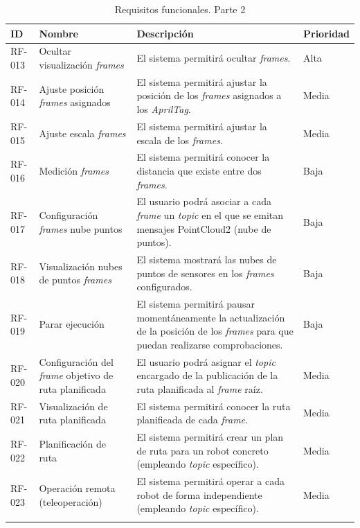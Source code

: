 \begin{longtable}{|p{2cm}|p{4cm}|p{7cm}|p{2cm}|}
\hline
\textbf{ID} & \textbf{Nombre} & \textbf{Descripción} & \textbf{Prioridad} \\
\hline
RF-013 & Ocultar visualización \textit{frames} & El sistema permitirá ocultar \textit{frames}. & Alta \\
\hline
RF-014 & Ajuste posición \textit{frames} asignados & El sistema permitirá ajustar la posición de los \textit{frames} asignados a los \textit{AprilTag}. & Media \\
\hline
RF-015 & Ajuste escala \textit{frames} & El sistema permitirá ajustar la escala de los \textit{frames}. & Media \\
\hline
RF-016 & Medición \textit{frames} & El sistema permitirá conocer la distancia que existe entre dos \textit{frames}. & Baja \\
\hline
RF-017 & Configuración \textit{frames} nube puntos & El usuario podrá asociar a cada \textit{frame} un \textit{topic} en el que se emitan mensajes PointCloud2 (nube de puntos). & Baja \\
\hline
RF-018 & Visualización nubes de puntos \textit{frames} & El sistema mostrará las nubes de puntos de sensores en los \textit{frames} configurados. & Baja \\
\hline
RF-019 & Parar ejecución & El sistema permitirá pausar momentáneamente la actualización de la posición de los \textit{frames} para que puedan realizarse comprobaciones. & Baja \\
\hline
RF-020 & Configuración del \textit{frame} objetivo de ruta planificada & El usuario podrá asignar el \textit{topic} encargado de la publicación de la ruta planificada al \textit{frame} raíz. & Media \\
\hline
RF-021 & Visualización de ruta planificada & El sistema permitirá conocer la ruta planificada de cada \textit{frame}. & Media \\
\hline
RF-022 & Planificación de ruta & El sistema permitirá crear un plan de ruta para un robot concreto (empleando \textit{topic} específico). & Media \\
\hline
RF-023 & Operación remota (teleoperación) & El sistema permitirá operar a cada robot de forma independiente (empleando \textit{topic} específico). & Media \\
\hline
\caption{Requisitos funcionales. Parte 2}
\end{longtable}

